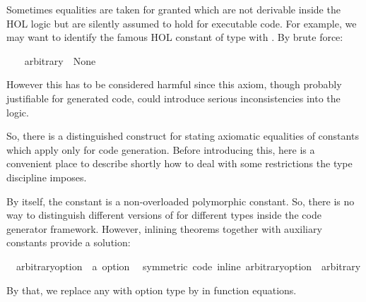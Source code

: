 \begin{isabellebody}
\begin{isamarkuptext}
  Sometimes equalities are taken for granted which are
  not derivable inside the HOL logic but are silently assumed
  to hold for executable code.  For example, we may want
  to identify the famous HOL constant 
  of type  with .
  By brute force:%
\end{isamarkuptext}%
\isamarkuptrue%
\isamarkupfalse%
\ \isanewline
\ \ {\isachardoublequoteopen}arbitrary\ {\isacharequal}\ None{\isachardoublequoteclose}%
\begin{isamarkuptext}%
However this has to be considered harmful since this axiom,
  though probably justifiable for generated code, could
  introduce serious inconsistencies into the logic.

  So, there is a distinguished construct for stating axiomatic
  equalities of constants which apply only for code generation.
  Before introducing this, here is a convenient place to describe
  shortly how to deal with some restrictions the type discipline
  imposes.

  By itself, the constant  is a non-overloaded
  polymorphic constant.  So, there is no way to distinguish
  different versions of  for different types
  inside the code generator framework.  However, inlining
  theorems together with auxiliary constants provide a solution:%
\end{isamarkuptext}%
\isamarkuptrue%
\isamarkupfalse%
\isanewline
\ \ arbitrary{\isacharunderscore}option\ {\isacharcolon}{\isacharcolon}\ {\isachardoublequoteopen}{\isacharprime}a\ option{\isachardoublequoteclose}\isanewline
\ \ {\isacharbrackleft}symmetric{\isacharcomma}\ code\ inline{\isacharbrackright}{\isacharcolon}\ {\isachardoublequoteopen}arbitrary{\isacharunderscore}option\ {\isacharequal}\ arbitrary{\isachardoublequoteclose}%
\begin{isamarkuptext}%
By that, we replace any  with option type
  by  in function equations.


\end{isamarkuptext}
\end{isabellebody}
